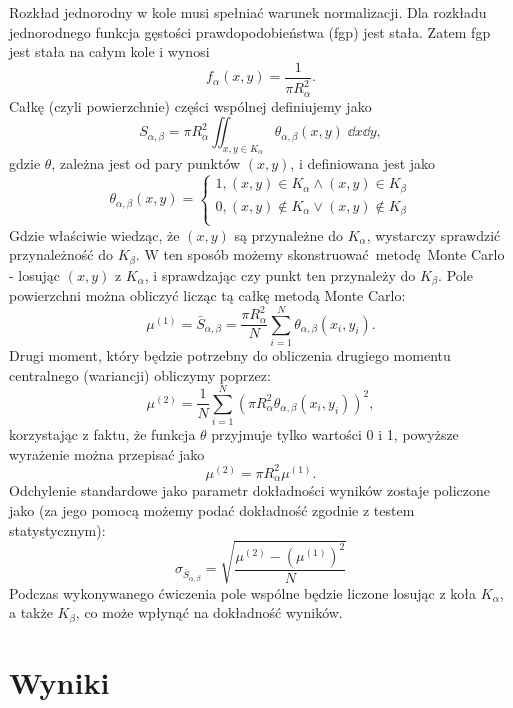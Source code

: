 \documentclass[a4paper, 12pt]{article}
\begin{document}
    \noaka Rozkład jednorodny w kole musi spełniać warunek normalizacji. 
    Dla rozkładu jednorodnego funkcja gęstości prawdopodobieństwa (fgp) jest stała.
    Zatem fgp jest stała na całym kole i wynosi
    \[ f_\alpha(x,y) = \frac{1}{\pi R_\alpha^2}.  \] 
    Całkę (czyli powierzchnie) części wspólnej definiujemy jako 
    \[S_{\alpha,\beta} = \pi R^2_\alpha \iint_{x,y \in K_\alpha} \theta_{\alpha,\beta}(x,y) \; \dd x \dd y,  \]
    gdzie $\theta$, zależna jest od pary punktów $(x,y)$, i definiowana jest jako
    \[\theta_{\alpha, \beta}(x,y) = \begin{cases}
        1, (x,y) \in K_\alpha \land (x,y) \in K_\beta \\
        0, (x,y) \notin K_\alpha \lor (x,y) \notin K_\beta  \\ 
    \end{cases} \] 
    Gdzie właściwie wiedząc, że $(x,y)$ są przynależne do $K_\alpha$, wystarczy sprawdzić przynależność do $K_\beta$. 
    W ten sposób możemy skonstruować metodę Monte Carlo - losując $(x,y)$ z $K_\alpha$, i sprawdzając czy punkt ten przynależy do $K_\beta$.
    Pole powierzchni można obliczyć licząc tą całkę metodą Monte Carlo:
    \begin{equation}
        \mu^{(1)} = \bar{S}_{\alpha,\beta} = \frac{\pi R_\alpha^2}{N} \sum_{i=1}^N \theta_{\alpha,\beta}(x_i,y_i).
        \label{mu_1}
    \end{equation}
    Drugi moment, który będzie potrzebny do obliczenia drugiego momentu centralnego (wariancji) obliczymy poprzez:
    \[ \mu^{(2)} = \frac{1}{N} \sum_{i = 1}^{N} \left( \pi R_\alpha^2  \theta_{\alpha,\beta}(x_i,y_i) \right)^2, \]
    korzystając z faktu, że funkcja $\theta$ przyjmuje tylko wartości 0 i 1, powyższe wyrażenie można przepisać jako
    \begin{equation}
        \mu^{(2)} =  \pi R_\alpha^2 \mu^{(1)}.
        \label{mu_2}
    \end{equation} 
    Odchylenie standardowe jako parametr dokładności wyników zostaje policzone jako (za jego pomocą możemy podać dokładność zgodnie z testem statystycznym):
    \begin{equation}
        \sigma_{\bar{S}_{\alpha,\beta}} = \sqrt{\frac{\mu^{(2)} - (\mu^{(1)})^2}{N}}
        \label{std_dev}
    \end{equation}
    Podczas wykonywanego ćwiczenia pole wspólne będzie liczone losując z koła $K_\alpha$, a także $K_\beta$, co może wpłynąć na dokładność wyników. 

    \section{Wyniki}
\end{document}
